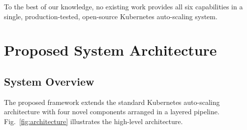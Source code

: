 \documentclass[journal]{IEEEtran}
\begin{document}
\begin{table}[h]
\centering
\caption{Comparison with Related Work Across Contribution Dimensions}
\label{tab:gap}
\end{table}

To the best of our knowledge, no existing work provides all six capabilities in a single, production-tested, open-source Kubernetes auto-scaling system.

\section{Proposed System Architecture}
\label{sec:architecture}

\subsection{System Overview}
The proposed framework extends the standard Kubernetes auto-scaling architecture with four novel components arranged in a layered pipeline. Fig.~\ref{fig:architecture} illustrates the high-level architecture.
\end{document}
